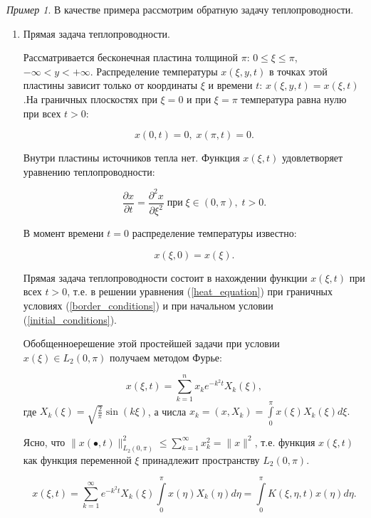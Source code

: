\documentclass[12pt,a4paper,titlepage,oneside]{book}
\theoremstyle{definition}
\theoremstyle{plain}
\theoremstyle{break}
\theoremstyle{remark}
\theoremstyle{remark}
\newtheorem*{example}{Пример}
\theoremstyle{remark}
\theoremstyle{remark}
\theoremstyle{plain}
\theoremstyle{plain}
\begin{document}
\begin{example}
В качестве примера рассмотрим обратную задачу теплопроводности.

\begin{enumerate}

\item Прямая задача теплопроводности.

Рассматривается бесконечная пластина толщиной $\pi$: $0 \leqslant \xi \leqslant\pi$, $-\infty < y < +\infty$. Распределение температуры $x(\xi, y, t)$ в точках этой пластины зависит только от координаты $\xi$ и времени $t$: $x(\xi, y, t) = x(\xi, t)$.На граничных плоскостях при $\xi = 0$ и при $\xi = \pi$ температура равна нулю при всех $t > 0$:

\begin{equation}
\label{border_conditions}
x(0, t) = 0,\;  x(\pi, t) = 0.
\end{equation}

Внутри пластины источников тепла нет. Функция $x(\xi, t)$ удовлетворяет уравнению теплопроводности:

\begin{equation}
\label{heat_equation}
\frac{\partial x}{\partial t} = \frac{\partial^2 x}{\partial \xi^2} \;  \mbox{при} \;   \xi \in (0, \pi),\;  t > 0.
\end{equation}

В момент времени $t = 0$ распределение температуры известно: 

\begin{equation}
\label{initial_conditions}
x(\xi,0)=x(\xi).
\end{equation}

Прямая задача теплопроводности состоит в нахождении функции $x(\xi,t)$ при всех $t >0$, т.е. в решении уравнения (\ref{heat_equation}) при граничных условиях (\ref{border_conditions}) и при начальном условии (\ref{initial_conditions}).

\guillemotleft Обобщенное\guillemotright \;решение этой простейшей задачи при условии $x(\xi) \in L_2(0, \pi)$ получаем методом Фурье:
\begin{center}
$$x(\xi,t) = \displaystyle\sum\limits_{k=1}^n x_k e^{-k^2t} X_k(\xi),$$ где $X_k(\xi) = \sqrt{\frac{2}{\pi}} \sin (k\xi)$, а числа $x_k = (x,X_k) = \displaystyle\int\limits_0^\pi x(\xi) X_k(\xi) d\xi\mbox{.}$
\end{center}

Ясно, что $\|x(\bullet, t)\|_{L_2 (0, \pi)}^{2} \leqslant \displaystyle\sum\limits_{k=1}^{\infty}x_k^2=\|x\|^2$, т.е. функция $x(\xi,t)$ как функция переменной $\xi$ принадлежит пространству $L_2 (0, \pi)$.
\begin{center}
$$x(\xi, t) = \displaystyle\sum\limits_{k=1}^{\infty} e^{-k^2 t} X_k(\xi) \int\limits_{0}^{\pi} x(\eta) X_k(\eta) d\eta = \int\limits_{0}^{\pi} K(\xi, \eta, t) x(\eta) d \eta \mbox{.}$$
\end{center}


\end{enumerate}
\end{example}
\end{document}
